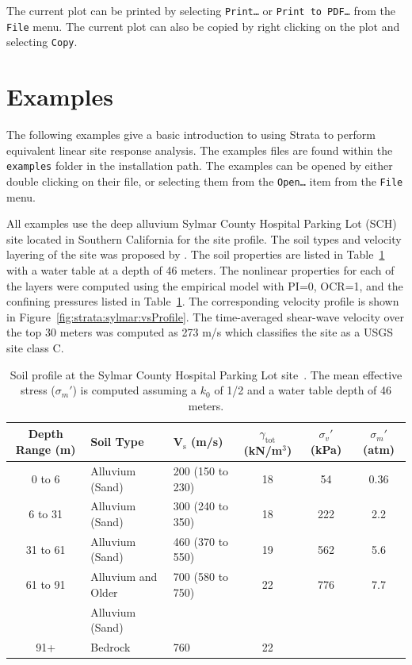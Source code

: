 \documentclass[12pt,oneside]{book}
\begin{document}
The current plot can be printed by selecting \texttt{Print\dots} or \texttt{Print to PDF\dots} from
the \texttt{File} menu.  The current plot can also be copied by right clicking on the plot and
selecting \texttt{Copy}.

\section{Examples}
The following examples give a basic introduction to using Strata to perform equivalent linear site
response analysis.  The examples files are found within the \texttt{examples} folder in the
installation path.  The examples can be opened by either double clicking on their file, or selecting
them from the \texttt{Open\dots} item from the \texttt{File} menu.

All examples use the deep alluvium Sylmar County Hospital Parking Lot (SCH) site located in Southern
California for the site profile.  The soil types and velocity layering of the site was proposed by
\citet{chang:96}.  The soil properties are listed in Table~\ref{tab:strata:sylmar:soil} with a water
table at a depth of 46 meters. The nonlinear properties for each of the layers were computed using
the \citet{darendeli:01} empirical model with PI=0, OCR=1, and the confining pressures listed in
Table~\ref{tab:strata:sylmar:soil}.  The corresponding velocity profile is shown in
Figure~\ref{fig:strata:sylmar:vsProfile}. The time-averaged shear-wave velocity over the top 30
meters was computed as 273 m/s which classifies the site as a USGS site class C.

\begin{table}
    \centering
    \begin{tabular}{cllccc}
        \hline\hline
        \textbf{Depth Range} (m) & \textbf{Soil Type} & \textbf{V$_\text{s}$} (m/s) &
        \textbf{$\gamma_\text{tot}$} (kN/m$^3$) & \textbf{$\sigma_v'$} (kPa) & \textbf{$\sigma_{m}'$} (atm) \\
        \hline
        0 to 6 & Alluvium (Sand) & 200 (150 to 230) & 18 & 54 & 0.36\\
        6 to 31 & Alluvium (Sand) & 300 (240 to 350) & 18 & 222 & 2.2 \\
        31 to 61 & Alluvium (Sand) & 460 (370 to 550) & 19 & 562 & 5.6 \\
        61 to 91 & Alluvium and Older & 700 (580 to 750) & 22 & 776 & 7.7 \\
                 & Alluvium (Sand) \\
        91+ & Bedrock & 760 & 22 \\
        \hline\hline
    \end{tabular}
    \caption{Soil profile at the Sylmar County Hospital Parking Lot site~\citep{chang:96}. The mean
        effective stress ($\sigma_{m}'$) is computed assuming a $k_0$ of 1/2 and a water table depth of 46
    meters.}
    \label{tab:strata:sylmar:soil}
\end{table}
\end{document}
